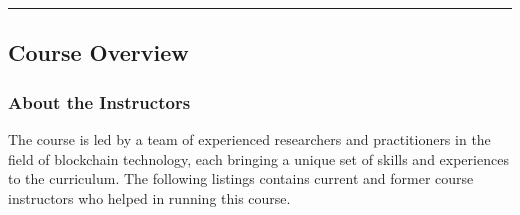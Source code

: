\begin{center}\rule{0.5\linewidth}{0.5pt}\end{center}

\subsection{Course Overview}\label{section-1-course-overview}

\subsubsection{About the Instructors}\label{about-the-instructors}

The course is led by a team of experienced researchers and practitioners
in the field of blockchain technology, each bringing a unique set of
skills and experiences to the curriculum.
The following listings contains current and former course instructors who helped in running this course.
